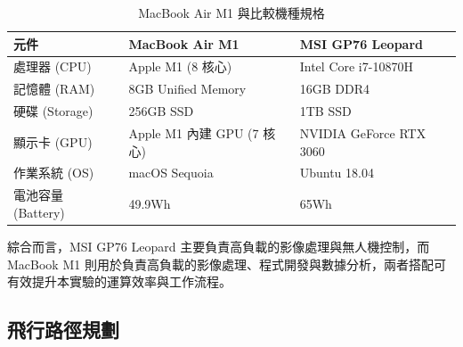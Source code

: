 \documentclass[12pt]{article}       %
\begin{document}
\begin{table}[H]
    \centering
    \caption{MacBook Air M1 與比較機種規格}
    \vspace{6pt} %
    \label{tab:macbook_m1}
    \begin{tabular}{lll}
        \toprule
        \textbf{元件} & \textbf{MacBook Air M1} & \textbf{MSI GP76 Leopard} \\
        \midrule
        處理器 (CPU)  & Apple M1 (8 核心) & Intel\textregistered{} Core\texttrademark{} i7-10870H \\
        記憶體 (RAM)  & 8GB Unified Memory & 16GB DDR4 \\
        硬碟 (Storage) & 256GB SSD  & 1TB SSD \\
        顯示卡 (GPU)  & Apple M1 內建 GPU (7 核心) & NVIDIA\textregistered{} GeForce\textregistered{} RTX 3060 \\
        作業系統 (OS)  & macOS Sequoia & Ubuntu 18.04 \\
        電池容量 (Battery) & 49.9Wh & 65Wh \\
        \bottomrule
    \end{tabular}
\end{table}

綜合而言，MSI GP76 Leopard 主要負責高負載的影像處理與無人機控制，而 MacBook M1 則用於負責高負載的影像處理、程式開發與數據分析，兩者搭配可有效提升本實驗的運算效率與工作流程。

\subsection{飛行路徑規劃}
\hspace{2em}









\end{document}
